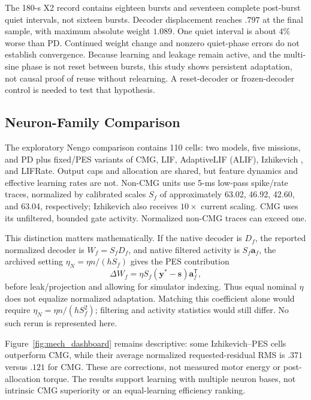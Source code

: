 \documentclass[letterpaper, 10 pt, conference]{ieeeconf}
\newcommand{\T}{^{\mathsf T}}
\begin{document}
The 180-s X2 record contains eighteen bursts and seventeen complete
post-burst quiet intervals, not sixteen bursts. Decoder displacement
reaches $.797$ at the final sample, with maximum absolute weight $1.089$.
One quiet interval is about $4\%$ worse than PD. Continued weight change
and nonzero quiet-phase errors do not establish convergence. Because
learning and leakage remain active, and the multi-sine phase is not reset
between bursts, this study shows persistent adaptation, not causal proof
of reuse without relearning. A reset-decoder or frozen-decoder control is
needed to test that hypothesis.

\subsection{Neuron-Family Comparison}
The exploratory Nengo comparison contains 110 cells: two models, five
missions, and PD plus fixed/PES variants of CMG, LIF, AdaptiveLIF (ALIF),
Izhikevich \cite{izhikevich2003}, and LIFRate. Output caps and allocation
are shared, but feature dynamics and effective learning rates are not.
Non-CMG units use 5-ms low-pass spike/rate traces, normalized by calibrated
scales $S_f$ of approximately 63.02, 46.92, 42.60, and 63.04, respectively;
Izhikevich also receives $10\times$ current scaling. CMG uses its
unfiltered, bounded gate activity. Normalized non-CMG traces can exceed one.

This distinction matters mathematically. If the native decoder is $D_f$,
the reported normalized decoder is $W_f=S_fD_f$, and native filtered
activity is $S_f\bm a_f$, the archived setting
$\eta_N=\eta n/(hS_f)$ gives the PES contribution
\begin{equation}
 \Delta W_f=\eta S_f(\bm y^*-\bm s)\bm a_f\T,
 \label{eq:familyscale}
\end{equation}
before leak/projection and allowing for simulator indexing. Thus equal
nominal $\eta$ does not equalize normalized adaptation. Matching this
coefficient alone would require $\eta_N=\eta n/(hS_f^2)$; filtering and
activity statistics would still differ. No such rerun is represented here.

Figure~\ref{fig:mech_dashboard} remains descriptive: some Izhikevich--PES
cells outperform CMG, while their average normalized requested-residual
RMS is $.371$ versus $.121$ for CMG. These are corrections, not measured
motor energy or post-allocation torque. The results support learning with
multiple neuron bases, not intrinsic CMG superiority or an equal-learning
efficiency ranking.
\end{document}
